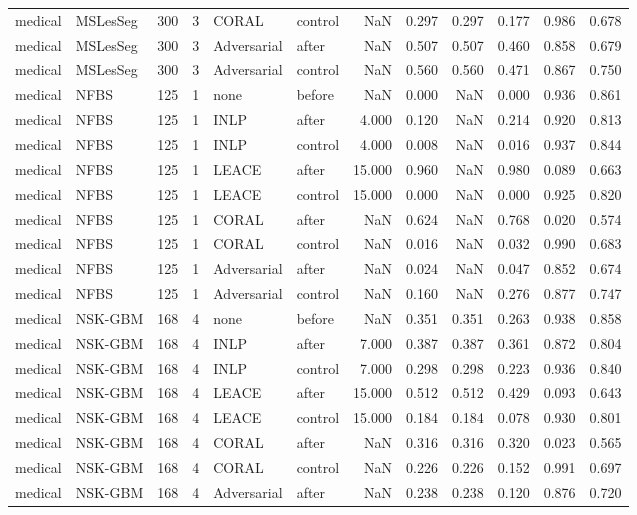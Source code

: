\begin{tabular}{llrrllrrrrrr}
medical & MSLesSeg & 300 & 3 & CORAL & control & NaN & 0.297 & 0.297 & 0.177 & 0.986 & 0.678 \\
medical & MSLesSeg & 300 & 3 & Adversarial & after & NaN & 0.507 & 0.507 & 0.460 & 0.858 & 0.679 \\
medical & MSLesSeg & 300 & 3 & Adversarial & control & NaN & 0.560 & 0.560 & 0.471 & 0.867 & 0.750 \\
medical & NFBS & 125 & 1 & none & before & NaN & 0.000 & NaN & 0.000 & 0.936 & 0.861 \\
medical & NFBS & 125 & 1 & INLP & after & 4.000 & 0.120 & NaN & 0.214 & 0.920 & 0.813 \\
medical & NFBS & 125 & 1 & INLP & control & 4.000 & 0.008 & NaN & 0.016 & 0.937 & 0.844 \\
medical & NFBS & 125 & 1 & LEACE & after & 15.000 & 0.960 & NaN & 0.980 & 0.089 & 0.663 \\
medical & NFBS & 125 & 1 & LEACE & control & 15.000 & 0.000 & NaN & 0.000 & 0.925 & 0.820 \\
medical & NFBS & 125 & 1 & CORAL & after & NaN & 0.624 & NaN & 0.768 & 0.020 & 0.574 \\
medical & NFBS & 125 & 1 & CORAL & control & NaN & 0.016 & NaN & 0.032 & 0.990 & 0.683 \\
medical & NFBS & 125 & 1 & Adversarial & after & NaN & 0.024 & NaN & 0.047 & 0.852 & 0.674 \\
medical & NFBS & 125 & 1 & Adversarial & control & NaN & 0.160 & NaN & 0.276 & 0.877 & 0.747 \\
medical & NSK-GBM & 168 & 4 & none & before & NaN & 0.351 & 0.351 & 0.263 & 0.938 & 0.858 \\
medical & NSK-GBM & 168 & 4 & INLP & after & 7.000 & 0.387 & 0.387 & 0.361 & 0.872 & 0.804 \\
medical & NSK-GBM & 168 & 4 & INLP & control & 7.000 & 0.298 & 0.298 & 0.223 & 0.936 & 0.840 \\
medical & NSK-GBM & 168 & 4 & LEACE & after & 15.000 & 0.512 & 0.512 & 0.429 & 0.093 & 0.643 \\
medical & NSK-GBM & 168 & 4 & LEACE & control & 15.000 & 0.184 & 0.184 & 0.078 & 0.930 & 0.801 \\
medical & NSK-GBM & 168 & 4 & CORAL & after & NaN & 0.316 & 0.316 & 0.320 & 0.023 & 0.565 \\
medical & NSK-GBM & 168 & 4 & CORAL & control & NaN & 0.226 & 0.226 & 0.152 & 0.991 & 0.697 \\
medical & NSK-GBM & 168 & 4 & Adversarial & after & NaN & 0.238 & 0.238 & 0.120 & 0.876 & 0.720 \\

\end{tabular}
